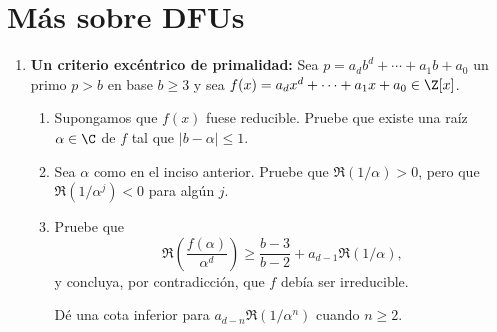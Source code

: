 \documentclass[11pt, reqno]{amsart}
\begin{document}
\section{Más sobre DFUs}
\begin{enumerate}[resume]
	\item\lookst
		\textbf{Un criterio excéntrico de primalidad:}
		Sea $p = a_db^d + \cdots + a_1b + a_0$ un primo $p > b$ en base $b \ge 3$ y
		sea $f(x) = a_dx^d + \cdots + a_1x + a_0 \in \Z[x]$.
		\begin{enumerate}
			\item Supongamos que $f(x)$ fuese reducible.
				Pruebe que existe una raíz $\alpha \in \C$ de $f$ tal que $|b - \alpha| \le 1$.

			\item Sea $\alpha$ como en el inciso anterior.
				Pruebe que $\Re(1/\alpha) > 0$, pero que $\Re(1/\alpha^j) < 0$ para algún $j$. 

			\item Pruebe que
				\[
					\Re\mathopen{}\left( \frac{f(\alpha)}{\alpha^d} \right) \ge \frac{b-3}{b-2} + a_{d-1} \Re(1/\alpha),
				\]
				y concluya, por contradicción, que $f$ debía ser irreducible.

				\begin{hint}
					Dé una cota inferior para $a_{d-n} \Re(1/\alpha^n)$ cuando $n \ge 2$.
				\end{hint}

		\end{enumerate}
		\nocite{granville:masterclass}


\end{enumerate}
\end{document}

